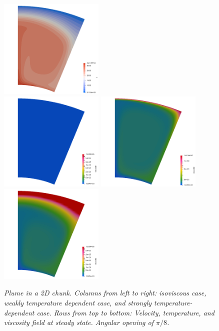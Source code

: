 \begin{figure}
  \includegraphics[width=5cm]{cookbooks/plume_2D_chunk/doc/T3}\\
  \includegraphics[width=5cm]{cookbooks/plume_2D_chunk/doc/eta1}
  \includegraphics[width=5cm]{cookbooks/plume_2D_chunk/doc/eta2}
  \includegraphics[width=5cm]{cookbooks/plume_2D_chunk/doc/eta3}
  \caption{\it Plume in a 2D chunk. Columns from left to right: isoviscous case, weakly temperature dependent case, and strongly temperature-dependent case. Rows from top to bottom: Velocity, temperature, and viscosity field at steady state. Angular opening of $\pi/8$.}
  \label{fig:plume-diff-creep}
\end{figure}

